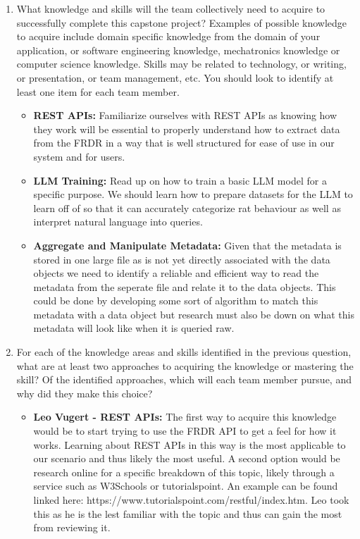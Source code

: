   \begin{enumerate}

   \item What knowledge and skills will the team collectively need to acquire to
  successfully complete this capstone project?  Examples of possible knowledge
  to acquire include domain specific knowledge from the domain of your
  application, or software engineering knowledge, mechatronics knowledge or
  computer science knowledge.  Skills may be related to technology, or writing,
  or presentation, or team management, etc.  You should look to identify at
  least one item for each team member.

    \begin{itemize}
      \item \textbf{REST APIs: } Familiarize ourselves with REST APIs as knowing how they work will be essential to properly understand how to extract data from the 
    FRDR in a way that is well structured for ease of use in our system and for users.

      \item \textbf{LLM Training: } Read up on how to train a basic LLM model for a specific purpose. We should learn how to prepare
    datasets for the LLM to learn off of so that it can accurately categorize rat behaviour as well as interpret natural language into queries.

    \item \textbf{Aggregate and Manipulate Metadata: } Given that the metadata is stored in one large file as is not yet directly associated with the data objects
    we need to identify a reliable and efficient way to read the metadata from the seperate file and relate it to the data objects. This could be done
    by developing some sort of algorithm to match this metadata with a data object but research must also be down on what this metadata will look like
    when it is queried raw.

    \end{itemize}


  \item For each of the knowledge areas and skills identified in the previous
  question, what are at least two approaches to acquiring the knowledge or
  mastering the skill?  Of the identified approaches, which will each team
  member pursue, and why did they make this choice?

  \begin{itemize}
      \item \textbf{Leo Vugert - REST APIs: }The first way to acquire this knowledge would be to start trying to use the FRDR API to get a feel for
      how it works. Learning about REST APIs in this way is the most applicable to our scenario and thus likely the most useful. A second option
      would be research online for a specific breakdown of this topic, likely through a service such as W3Schools or tutorialspoint. An example can
      be found linked here: https://www.tutorialspoint.com/restful/index.htm. Leo took this as he is the lest familiar with the topic and thus
      can gain the most from reviewing it.


\end{itemize}
\end{enumerate}
